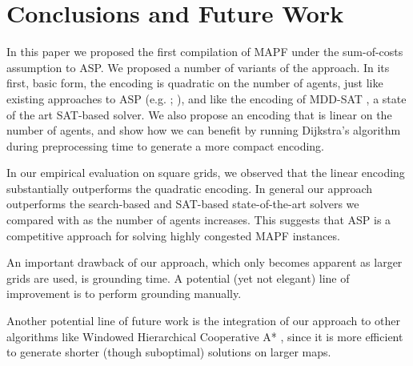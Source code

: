 \section{Conclusions and Future Work}
In this paper we proposed the first compilation of MAPF under the sum-of-costs assumption to ASP. We proposed a number of variants of the approach. In its first, basic form, the encoding is quadratic on the number of agents, just like existing approaches to ASP (e.g. ; ), and like the encoding of MDD-SAT \cite{SurynekFSB16}, a state of the art SAT-based solver. We also propose an encoding that is linear on the number of agents, and show how we can benefit by running Dijkstra's algorithm during preprocessing time to generate a more compact encoding.

In our empirical evaluation on square grids, we observed that the linear encoding substantially outperforms the quadratic encoding. In general our approach outperforms the search-based and SAT-based state-of-the-art solvers we compared with as the number of agents increases. This suggests that ASP is a competitive approach for solving highly congested MAPF instances.

An important drawback of our approach, which only becomes apparent as larger grids are used, is grounding time. A potential (yet not elegant) line of improvement is to perform grounding manually.

Another potential line of future work is the integration of our approach to other algorithms like Windowed Hierarchical Cooperative A* \cite{Silver05}, since it is more efficient to generate shorter (though suboptimal) solutions on larger maps.
